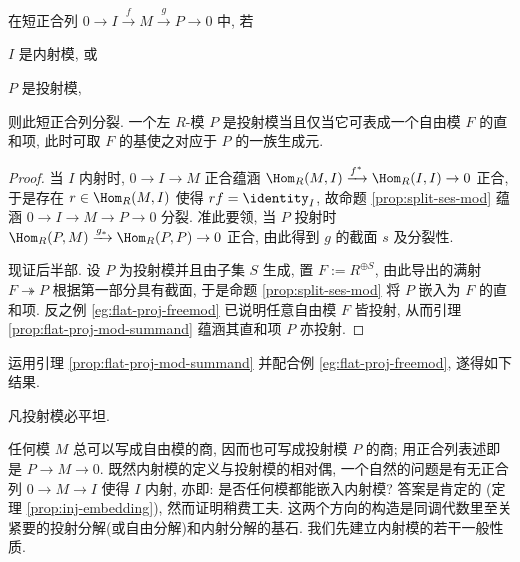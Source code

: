 \begin{proposition}\label{prop:proj-mod-characterization}
	在短正合列 $0 \to I \xrightarrow{f} M \xrightarrow{g} P \to 0$ 中, 若
	\begin{inparaenum}[(i)]
		\item $I$ 是内射模, 或
		\item $P$ 是投射模,
	\end{inparaenum}
	则此短正合列分裂. 一个左 $R$-模 $P$ 是投射模当且仅当它可表成一个自由模 $F$ 的直和项, 此时可取 $F$ 的基使之对应于 $P$ 的一族生成元.
\end{proposition}
\begin{proof}
	当 $I$ 内射时, $0 \to I \to M$ 正合蕴涵 $\Hom_R(M,I) \xrightarrow{f^*} \Hom_R(I,I) \to 0$ 正合, 于是存在 $r \in \Hom_R(M,I)$ 使得 $rf = \identity_I$, 故命题 \ref{prop:split-ses-mod} 蕴涵 $0 \to I \to M \to P \to 0$ 分裂. 准此要领, 当 $P$ 投射时 $\Hom_R(P,M) \xrightarrow{g_*} \Hom_R(P,P) \to 0$ 正合, 由此得到 $g$ 的截面 $s$ 及分裂性.

	现证后半部. 设 $P$ 为投射模并且由子集 $S$ 生成, 置 $F := R^{\oplus S}$, 由此导出的满射 $F \twoheadrightarrow P$ 根据第一部分具有截面, 于是命题 \ref{prop:split-ses-mod} 将 $P$ 嵌入为 $F$ 的直和项. 反之例 \ref{eg:flat-proj-freemod} 已说明任意自由模 $F$ 皆投射, 从而引理 \ref{prop:flat-proj-mod-summand} 蕴涵其直和项 $P$ 亦投射.
\end{proof}

运用引理 \ref{prop:flat-proj-mod-summand} 并配合例 \ref{eg:flat-proj-freemod}, 遂得如下结果.
\begin{corollary}
	凡投射模必平坦.
\end{corollary}

任何模 $M$ 总可以写成自由模的商, 因而也可写成投射模 $P$ 的商; 用正合列表述即是 $P \to M \to 0$. 既然内射模的定义与投射模的相对偶, 一个自然的问题是有无正合列 $0 \to M \to I$ 使得 $I$ 内射, 亦即: 是否任何模都能嵌入内射模? 答案是肯定的 (定理 \ref{prop:inj-embedding}), 然而证明稍费工夫. 这两个方向的构造是同调代数里至关紧要的投射分解(或自由分解)和内射分解的基石. 我们先建立内射模的若干一般性质.

